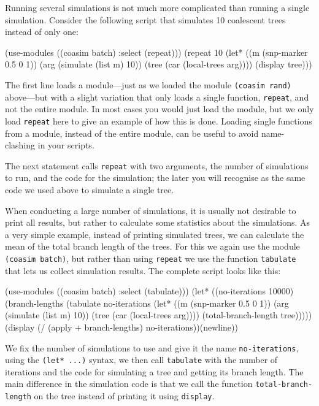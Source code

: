 \documentclass{manual}
\begin{document}
Running several simulations is not much more complicated than running
a single simulation.  Consider the following script that simulates 10
coalescent trees instead of only one:
\begin{code}
(use-modules ((coasim batch) :select (repeat)))
(repeat 10 (let* ((m (snp-marker 0.5 0 1))
                  (arg (simulate (list m) 10))
                  (tree (car (local-trees arg))))
             (display tree)))
\end{code}

The first line loads a module---just as we loaded the module
\texttt{(coasim rand)} above---but with a slight variation that only
loads a single function, \texttt{repeat}, and not the entire module.
In most cases you would just load the module, but we only load
\texttt{repeat} here to give an example of how this is done.  Loading
single functions from a module, instead of the entire module, can be
useful to avoid name-clashing in your scripts.

The next statement calls \texttt{repeat} with two arguments, the
number of simulations to run, and the code for the simulation; the
later you will recognise as the same code we used above to simulate a
single tree.

When conducting a large number of simulations, it is usually not
desirable to print all results, but rather to calculate some
statistics about the simulations.  As a very simple example, instead
of printing simulated trees, we can calculate the mean of the total
branch length of the trees.  For this we again use the module
\texttt{(coasim batch)}, but rather than using \texttt{repeat} we use
the function \texttt{tabulate} that lets us collect simulation
results.  The complete script looks like this:
\begin{code}
(use-modules ((coasim batch) :select (tabulate)))
(let* ((no-iterations 10000)
       (branch-lengths
        (tabulate no-iterations
                  (let* ((m (snp-marker 0.5 0 1))
                         (arg (simulate (list m) 10))
                         (tree (car (local-trees arg))))
                    (total-branch-length tree)))))
  (display (/ (apply + branch-lengths) no-iterations))(newline))
\end{code}

We fix the number of simulations to use and give it the name
\texttt{no-iterations}, using the \texttt{(let* ...)} syntax, we then
call \texttt{tabulate} with the number of iterations and the code for
simulating a tree and getting its branch length.  The main difference
in the simulation code is that we call the function
\texttt{total-branch-length} on the tree instead of printing it using
\texttt{display}.
\end{document}
